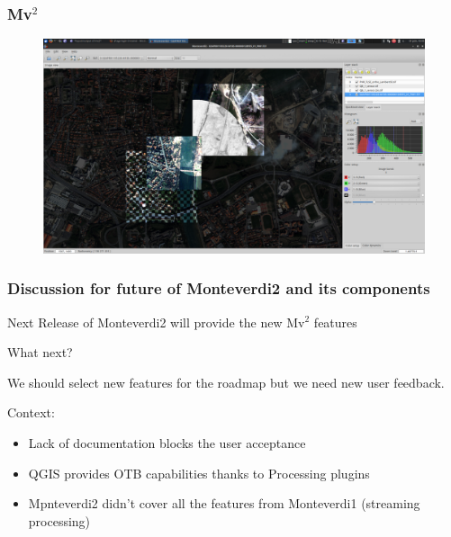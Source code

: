 \documentclass[8pt]{beamer}
\begin{document}

\begin{frame}
\frametitle{Mv$^{2}$}
\begin{figure}[hbtp]
    \centering
    \includegraphics[scale=0.17]{images/2015-06-01_Shader-edition.png} 
\end{figure}
\end{frame}


\begin{frame}
\frametitle{Discussion for future of Monteverdi2 and its components}
Next Release of Monteverdi2 will provide the new Mv$^{2}$ features

What next?

We should select new features for the roadmap but we need new user feedback. 

Context: 
\begin{itemize}
 \item Lack of documentation blocks the user acceptance
 \item QGIS provides OTB capabilities thanks to Processing plugins 
 \item Mpnteverdi2 didn't cover all the features from Monteverdi1 (streaming processing)
\end{itemize}
\end{frame}
\end{document}
